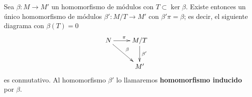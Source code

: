 \begin{proposicion}
	 \label{prop:teo-fact} Sea \(\beta: M \rightarrow M'\)
	un homomorfismo de módulos con \(T \subset \ker \beta\). Existe entonces un
	único homomorfismo de módulos \(\beta': M/T \rightarrow M'\) con
	\(\beta'\pi = \beta\); es decir, el siguiente diagrama con \(\beta(T) = 0\)
	\begin{equation}
		\label{firstisothm}\xymatrix{ N \ar[r]^\pi \ar[dr]^\beta & M/T \ar[d]^{\beta'} \\ & M' }
	\end{equation}
	es conmutativo. Al homomorfismo \(\beta'\) lo llamaremos \textbf{homomorfismo
		inducido} por \(\beta\).
\end{proposicion}
%
%
